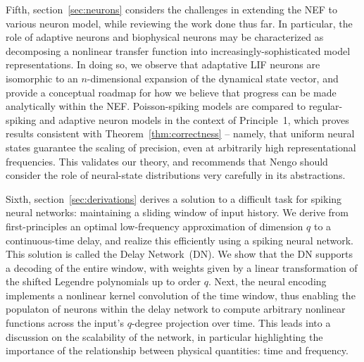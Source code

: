 Fifth, section~\ref{sec:neurons} considers the challenges in extending the NEF to various neuron model, while reviewing the work done thus far.
In particular, the role of adaptive neurons and biophysical neurons may be characterized as decomposing a nonlinear transfer function into increasingly-sophisticated model representations.
In doing so, we observe that adaptative LIF neurons are isomorphic to an $n$-dimensional expansion of the dynamical state vector, and provide a conceptual roadmap for how we believe that progress can be made analytically within the NEF.
Poisson-spiking models are compared to regular-spiking and adaptive neuron models in the context of Principle~1, which proves results consistent with Theorem~\ref{thm:correctness} -- namely, that uniform neural states guarantee the scaling of precision, even at arbitrarily high representational frequencies.
This validates our theory, and recommends that Nengo should consider the role of neural-state distributions very carefully in its abstractions.

Sixth, section~\ref{sec:derivations} derives a solution to a difficult task for spiking neural networks: maintaining a sliding window of input history.
We derive from first-principles an optimal low-frequency approximation of dimension $q$ to a continuous-time delay, and realize this efficiently using a spiking neural network.
This solution is called the Delay Network~(DN).
We show that the DN supports a decoding of the entire window, with weights given by a linear transformation of the shifted Legendre polynomials up to order $q$.
Next, the neural encoding implements a nonlinear kernel convolution of the time window, thus enabling the populaton of neurons within the delay network to compute arbitrary nonlinear functions across the input's $q$-degree projection over time.
This leads into a discussion on the scalability of the network, in particular highlighting the importance of the relationship between physical quantities: time and frequency.

